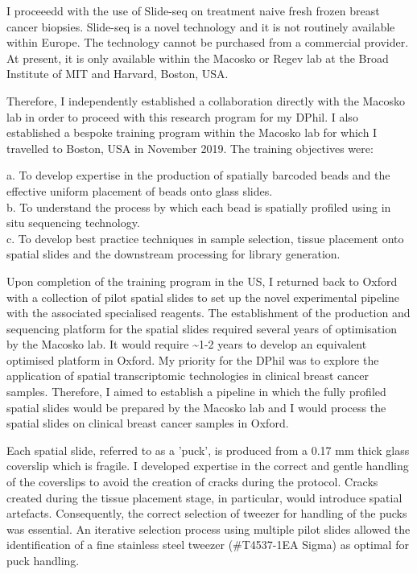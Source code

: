 I proceeedd with the use of Slide-seq on treatment naive fresh frozen breast cancer biopsies. Slide-seq is a novel technology and it is not routinely available within Europe. The technology cannot be purchased from a commercial provider. At present, it is only available within the Macosko or Regev lab at the Broad Institute of MIT and Harvard, Boston, USA.


Therefore, I independently established a collaboration directly with the Macosko lab in order to proceed with this research program for my DPhil. I also established a bespoke training program within the Macosko lab for which I travelled to Boston, USA in November 2019. The training objectives were:

a. To develop expertise in the production of spatially barcoded beads and the effective uniform placement of beads onto glass slides. \\
b. To understand the process by which each bead is spatially profiled using in situ sequencing technology. \\
c. To develop best practice techniques in sample selection, tissue placement onto spatial slides and the downstream processing for library generation.

Upon completion of the training program in the US, I returned back to Oxford with a collection of pilot spatial slides to set up the novel experimental pipeline with the associated specialised reagents. The establishment of the production and sequencing platform for the spatial slides required several years of optimisation by the Macosko lab. It would require \textasciitilde 1-2 years to develop an equivalent optimised platform in Oxford. My priority for the DPhil was to explore the application of spatial transcriptomic technologies in clinical breast cancer samples. Therefore, I aimed to establish a pipeline in which the fully profiled spatial slides would be prepared by the Macosko lab and I would process the spatial slides on clinical breast cancer samples in Oxford.

Each spatial slide, referred to as a 'puck', is produced from a 0.17 mm thick glass coverslip which is fragile. I developed expertise in the correct and gentle handling of the coverslips to avoid the creation of cracks during the protocol. Cracks created during the tissue placement stage, in particular, would introduce spatial artefacts. Consequently, the correct selection of tweezer for handling of the pucks was essential. An iterative selection process using multiple pilot slides allowed the identification of a fine stainless steel tweezer (\#T4537-1EA Sigma) as optimal for puck handling.

